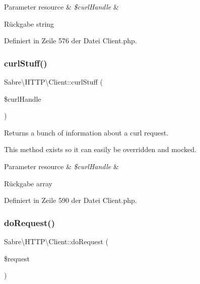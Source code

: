 \begin{DoxyParams}[1]{Parameter}
resource & {\em \$curl\+Handle} & \\
\hline
\end{DoxyParams}
\begin{DoxyReturn}{Rückgabe}
string 
\end{DoxyReturn}


Definiert in Zeile 576 der Datei Client.\+php.

\mbox{\label{class_sabre_1_1_h_t_t_p_1_1_client_a89f0e6bec2232a1662e60ff33df89af0}} 
\subsubsection{\texorpdfstring{curl\+Stuff()}{curlStuff()}}
{\footnotesize\ttfamily Sabre\textbackslash{}\+H\+T\+T\+P\textbackslash{}\+Client\+::curl\+Stuff (\begin{DoxyParamCaption}\item[{}]{\$curl\+Handle }\end{DoxyParamCaption})\hspace{0.3cm}{\ttfamily [protected]}}

Returns a bunch of information about a curl request.

This method exists so it can easily be overridden and mocked.


\begin{DoxyParams}[1]{Parameter}
resource & {\em \$curl\+Handle} & \\
\hline
\end{DoxyParams}
\begin{DoxyReturn}{Rückgabe}
array 
\end{DoxyReturn}


Definiert in Zeile 590 der Datei Client.\+php.

\mbox{\label{class_sabre_1_1_h_t_t_p_1_1_client_a6dec075ac2ae52ae24888498e2d7848f}} 
\subsubsection{\texorpdfstring{do\+Request()}{doRequest()}}
{\footnotesize\ttfamily Sabre\textbackslash{}\+H\+T\+T\+P\textbackslash{}\+Client\+::do\+Request (\begin{DoxyParamCaption}\item[{\mbox{\hyperlink{interface_sabre_1_1_h_t_t_p_1_1_request_interface}{Request\+Interface}}}]{\$request }\end{DoxyParamCaption})\hspace{0.3cm}{\ttfamily [protected]}}

